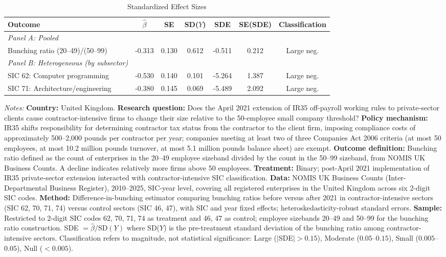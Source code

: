 \begin{table}[htbp]
\centering
\caption{Standardized Effect Sizes}
\label{tab:sde}
\footnotesize
\begin{tabular}{lcccccc}
\hline\hline
Outcome & $\hat{\beta}$ & SE & SD($Y$) & SDE & SE(SDE) & Classification \\
\hline
\textit{Panel A: Pooled} & & & & & & \\
Bunching ratio (20--49)/(50--99) & -0.313 & 0.130 & 0.612 & -0.511 & 0.212 & Large neg. \\[6pt]
\textit{Panel B: Heterogeneous (by subsector)} & & & & & & \\
SIC 62: Computer programming & -0.530 & 0.140 & 0.101 & -5.264 & 1.387 & Large neg. \\
SIC 71: Architecture/engineering & -0.380 & 0.145 & 0.069 & -5.489 & 2.092 & Large neg. \\
\hline\hline
\end{tabular}
\begin{tablenotes}
\footnotesize
\item \textit{Notes:} \textbf{Country:} United Kingdom. \textbf{Research question:} Does the April 2021 extension of IR35 off-payroll working rules to private-sector clients cause contractor-intensive firms to change their size relative to the 50-employee small company threshold? \textbf{Policy mechanism:} IR35 shifts responsibility for determining contractor tax status from the contractor to the client firm, imposing compliance costs of approximately 500--2,000 pounds per contractor per year; companies meeting at least two of three Companies Act 2006 criteria (at most 50 employees, at most 10.2 million pounds turnover, at most 5.1 million pounds balance sheet) are exempt. \textbf{Outcome definition:} Bunching ratio defined as the count of enterprises in the 20--49 employee sizeband divided by the count in the 50--99 sizeband, from NOMIS UK Business Counts. A decline indicates relatively more firms above 50 employees. \textbf{Treatment:} Binary; post-April 2021 implementation of IR35 private-sector extension interacted with contractor-intensive SIC classification. \textbf{Data:} NOMIS UK Business Counts (Inter-Departmental Business Register), 2010--2025, SIC-year level, covering all registered enterprises in the United Kingdom across six 2-digit SIC codes. \textbf{Method:} Difference-in-bunching estimator comparing bunching ratios before versus after 2021 in contractor-intensive sectors (SIC 62, 70, 71, 74) versus control sectors (SIC 46, 47), with SIC and year fixed effects; heteroskedasticity-robust standard errors. \textbf{Sample:} Restricted to 2-digit SIC codes 62, 70, 71, 74 as treatment and 46, 47 as control; employee sizebands 20--49 and 50--99 for the bunching ratio construction. SDE $= \hat{\beta} / \text{SD}(Y)$ where SD($Y$) is the pre-treatment standard deviation of the bunching ratio among contractor-intensive sectors. Classification refers to magnitude, not statistical significance: Large ($|$SDE$| > 0.15$), Moderate ($0.05$--$0.15$), Small ($0.005$--$0.05$), Null ($< 0.005$).
\end{tablenotes}
\end{table}
